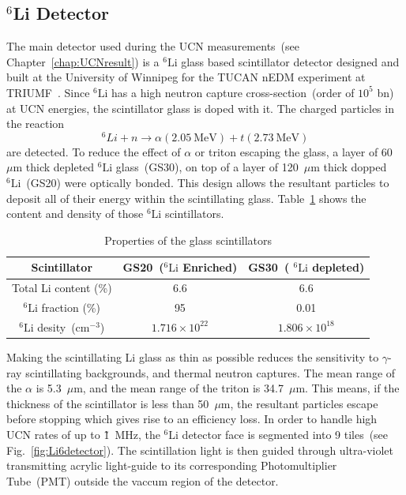 \subsection{$^6$Li Detector\label{sec:Li6detector}}
The main detector used during the UCN measurements~(see
Chapter~\ref{chap:UCNresult}) is a $^6\mathrm{Li}$ glass based
scintillator detector designed and built at the University of Winnipeg
for the TUCAN nEDM experiment at
TRIUMF~\cite{jamieson2017characterization}. Since $^6\mathrm{Li}$ has
a high neutron capture cross-section~(order of $10^5$ bn) at UCN
energies, the scintillator glass is doped with it. The charged
particles in the reaction
\begin{equation}
^6Li + n \rightarrow \alpha (2.05~\mathrm{MeV}) + t (2.73~\mathrm{MeV})
\end{equation}
are detected. To reduce the effect of $\alpha$ or triton escaping the
glass, a layer of 60~$\mu$m thick depleted $^6\mathrm{Li}$
glass~(GS30), on top of a layer of 120~$\mu$m thick dopped
$^6\mathrm{Li}$~(GS20) were optically bonded. This design allows the
resultant particles to deposit all of their energy within the
scintillating glass. Table~\ref{tab:scintillator} shows the content
and density of those $^6\mathrm{Li}$ scintillators.

\begin{table}[h!]
  \centering
  \label{tab:scintillator}
  \begin{tabular}{|c|c|c|}
    \hline
    Scintillator & GS20~($^6\mathrm{Li}$ Enriched) & GS30~( $^6\mathrm{Li}$ depleted) \\
    \hline
    Total Li content (\%) & 6.6 & 6.6 \\
    \hline
    $^6\mathrm{Li}$ fraction (\%) & 95 & 0.01 \\
    \hline
    $^6\mathrm{Li}$ desity~(cm$^{-3}$) & $1.716 \times 10^{22}$ & $1.806 \times 10^{18}$ \\
    \hline
  \end{tabular}
  \caption{Properties of the glass scintillators}
\end{table}


Making the scintillating Li glass as thin as possible reduces the
sensitivity to $\gamma$-ray scintillating backgrounds, and thermal
neutron captures. The mean range of the $\alpha$ is 5.3~$\mu$m, and the
mean range of the triton is 34.7~$\mu$m. This means, if the
thickness of the scintillator is less than 50~$\mu$m, the resultant
particles escape before stopping which gives rise to an efficiency
loss.  In order to handle high UCN rates of up to \~1~MHz, the
$^6\mathrm{Li}$ detector face is segmented into 9 tiles~(see
Fig.~\ref{fig:Li6detector}). The scintillation light is then guided
through ultra-violet transmitting acrylic light-guide to its
corresponding Photomultiplier Tube~(PMT) outside the vaccum region of
the detector.

